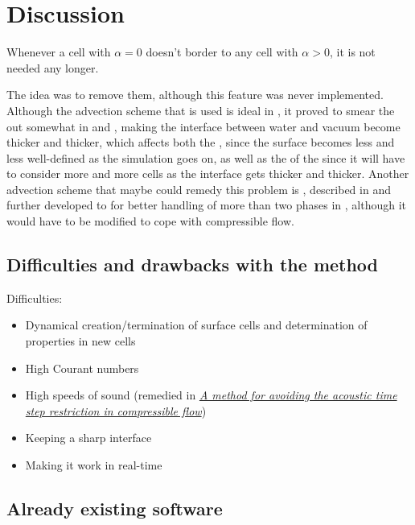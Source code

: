 \chapter{Discussion}

Whenever a cell with $\alpha = 0$ doesn't border to any cell with $\alpha > 0$, it is not needed any longer.

The idea was to remove them, although this feature was never implemented. Although the advection scheme that is used is ideal in , it proved to smear the  out somewhat in  and , making the interface between water and vacuum become thicker and thicker, which affects both the , since the surface becomes less and less well-defined as the simulation goes on, as well as the \performance of the  since it will have to consider more and more cells as the interface gets thicker and thicker. Another advection scheme that maybe could remedy this problem is \MULES, described in \citep{Berberovi2009} and further developed to for better handling of more than two phases in \citep{Kissling2010}, although it would have to be modified to cope with compressible flow.

\section{Difficulties and drawbacks with the method}

Difficulties:
\begin{itemize}
    \item Dynamical creation/termination of surface cells and determination of properties in new cells
    \item High Courant numbers
    \item High speeds of sound (remedied in \textit{\href{http://physbam.stanford.edu/~kwatra/papers/compressible_semi_implicit/compressible_semi_implicit.pdf}{A method for avoiding the acoustic time step restriction in compressible flow}})
    \item Keeping a sharp interface
    \item Making it work in real-time
\end{itemize}

\section{Already existing software}

